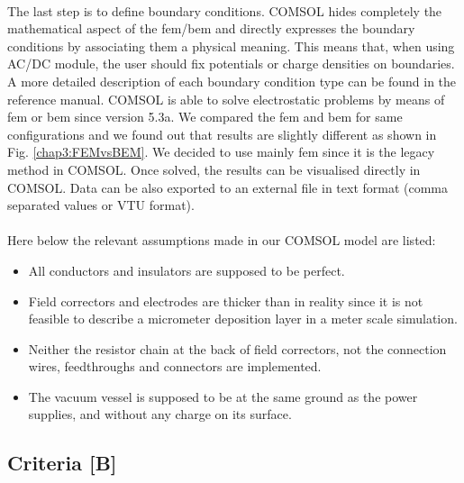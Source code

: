 \begin{refsection}
  

  \paragraph{}
  The last step is to define boundary conditions. COMSOL hides completely the mathematical aspect of the \acrshort{fem}/\acrshort{bem} and directly expresses the boundary conditions by associating them a physical meaning. This means that, when using AC/DC module, the user should fix potentials or charge densities on boundaries. A more detailed description of each boundary condition type can be found in the reference manual. COMSOL is able to solve electrostatic problems by means of \acrshort{fem} or \acrshort{bem} since version 5.3a. We compared the \acrshort{fem} and \acrshort{bem} for same configurations and we found out that results are slightly different as shown in Fig. \ref{chap3:FEMvsBEM}. We decided to use mainly \acrshort{fem} since it is the legacy method in COMSOL.
  Once solved, the results can be visualised directly in COMSOL. Data can be also exported to an external file in text format (comma separated values or VTU format).

  

  \paragraph{}
  Here below the relevant assumptions made in our COMSOL model are listed:
  \begin{itemize}
    \item All conductors and insulators are supposed to be perfect.
    \item Field correctors and electrodes are thicker than in reality since it is not feasible to describe a micrometer deposition layer in a meter scale simulation.
    \item Neither the resistor chain at the back of field correctors, not the connection wires, feedthroughs and connectors are implemented.
    \item The vacuum vessel is supposed to be at the same ground as the power supplies, and without any charge on its surface.
  \end{itemize}

  \subsection{Criteria [B]}


\end{refsection}
